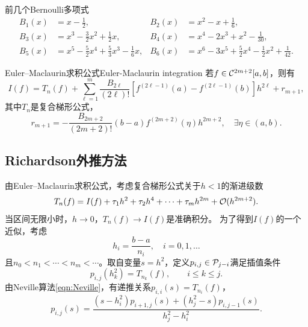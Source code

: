 \begin{example}
    {前几个Bernoulli多项式}{}
    \begin{equation}\label{eq:na-bernoulli-polynomials}
        \begin{aligned}
            B_1(x) &= x - \frac12,&B_2(x) &= x^2 - x + \frac16,\\
            B_3(x) &= x^3 - \frac32x^2 + \frac12x,&B_4(x) &= x^4 - 2x^3 + x^2 - \frac1{30},\\
            B_5(x) &= x^5 - \frac52x^4 + \frac53x^3 - \frac16x,&B_6(x) &= x^6 - 3x^5 + \frac52x^4 - \frac12x^2 + \frac1{42}.
        \end{aligned}
    \end{equation}
\end{example}

\begin{theorem}
    {Euler--Maclaurin求积公式}{Euler-Maclaurin integration}
    若$f \in \mathcal{C}^{2m+2}[a,b]$，则有
    \begin{equation}
        I(f) = T_n(f) + \sum_{\ell=1}^m\frac{B_{2\ell}}{(2\ell)!}[f^{(2\ell-1)}(a) - f^{(2\ell-1)}(b)]h^{2\ell} + r_{m+1},
    \end{equation}
    其中$T_n$是复合梯形公式，
    \begin{equation}
        r_{m+1} = -\frac{B_{2m+2}}{(2m + 2)!}(b - a)f^{(2m+2)}(\eta)h^{2m+2},\quad\exists\eta \in (a,b).
    \end{equation}
\end{theorem}

\subsection{Richardson外推方法}


由Euler--Maclaurin求积公式，考虑复合梯形公式关于$h < 1$的渐进级数
\begin{equation}\label{eq:na-trapezoid-error-expansion}
    T_n(f) = I(f) + \tau_1h^2 + \tau_2h^4 + \cdots + \tau_mh^{2m} + \mathcal{O}(h^{2m+2}).
\end{equation}
当区间无限小时，$h \to 0$，$T_n(f) \to I(f)$是准确积分。
为了得到$I(f)$的一个近似，考虑
\[
    h_i = \frac{b - a}{n_i},\quad i = 0,1,\ldots
\]
且$n_0 < n_1 < \cdots < n_m < \cdots$。取自变量$s = h^2$，定义$p_{i,j} \in \mathcal{P}_{j-i}$满足插值条件
\[
    p_{i,j}(h_k^2) = T_{n_k}(f),\qquad i \leq k \leq j.
\]
由Neville算法\eqref{eqn:Neville}，有递推关系$p_{i,i}(s) = T_{n_i}(f)$，
\begin{equation}\label{eq:na-extrapolation-recurrence}
    p_{i,j}(s) = \frac{(s - h_i^2)p_{i+1,j}(s) + (h_j^2 - s)p_{i,j-1}(s)}{h_j^2 - h_i^2}.
\end{equation}

